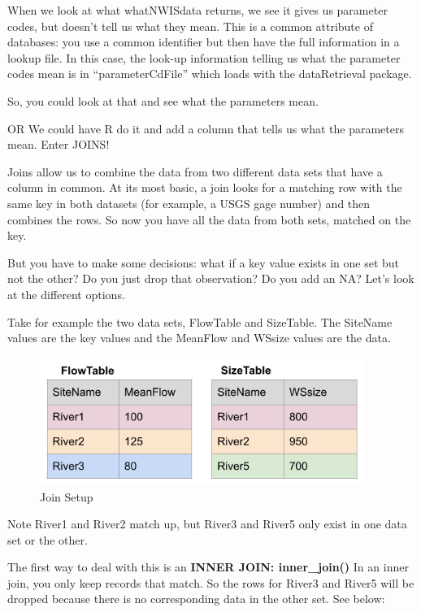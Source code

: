 \documentclass[
]{book}
\begin{document}
When we look at what whatNWISdata returns, we see it gives us parameter codes, but doesn't tell us what they mean. This is a common attribute of databases: you use a common identifier but then have the full information in a lookup file. In this case, the look-up information telling us what the parameter codes mean is in ``parameterCdFile'' which loads with the dataRetrieval package.

So, you could look at that and see what the parameters mean.

OR We could have R do it and add a column that tells us what the parameters mean. Enter JOINS!

Joins allow us to combine the data from two different data sets that have a column in common. At its most basic, a join looks for a matching row with the same key in both datasets (for example, a USGS gage number) and then combines the rows. So now you have all the data from both sets, matched on the key.

But you have to make some decisions: what if a key value exists in one set but not the other? Do you just drop that observation? Do you add an NA? Let's look at the different options.

Take for example the two data sets, FlowTable and SizeTable. The SiteName values are the key values and the MeanFlow and WSsize values are the data.

\begin{figure}
\centering
\includegraphics[width=4.16667in,height=\textheight]{images/joinsetup.png}
\caption{Join Setup}
\end{figure}

Note River1 and River2 match up, but River3 and River5 only exist in one data set or the other.

The first way to deal with this is an \textbf{INNER JOIN: inner\_join()} In an inner join, you only keep records that match. So the rows for River3 and River5 will be dropped because there is no corresponding data in the other set. See below:
\end{document}
